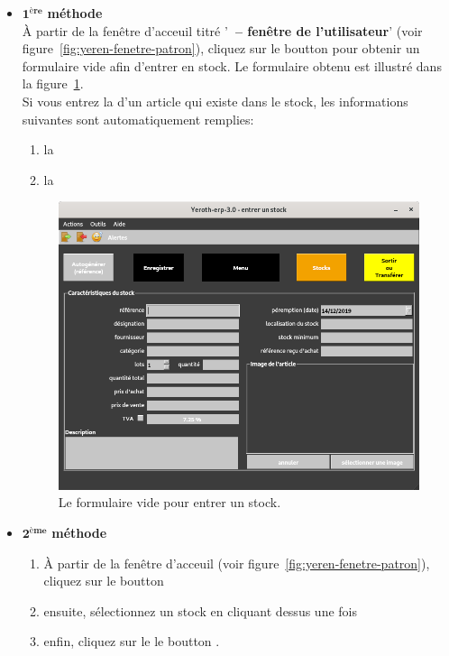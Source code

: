 \begin{itemize}[]
	\item \textcolor{purplish}{$\mathbf{1^{\text{\`ere}}}$ \textbf{m\'ethode}}\\
		   \`A partir de la fen\^etre d'acceuil titr\'e
		   '\textbf{\yerotherptitle\ -- fen\^etre de l'utilisateur}'
		   (voir figure~\ref{fig:yeren-fenetre-patron}), cliquez
		   sur le boutton  pour obtenir un
		   formulaire vide afin d'entrer en stock. Le formulaire
		   obtenu est illustr\'e dans la figure~\ref{fig:formulaire-entrer-1}.\\
		   
		   Si vous entrez la  d'un article qui existe
		   \deja dans le stock, les informations suivantes sont
		   automatiquement remplies:
		   \begin{enumerate}
		   		\item la \yerenfield{\designation}
		   		\item la \yerenfield{\designation}		   		
		   \end{enumerate}		    
		   
	      \begin{figure}[!htbp]
		  \centering
		  \includegraphics[scale=0.63]{images/yeren-fenetre-entrer.png}
		  \caption{Le formulaire vide pour entrer un stock.}
		  \label{fig:formulaire-entrer-1}
		  \end{figure}
	      
	      \newpage
	      
	\item \textcolor{purplish}{$\mathbf{2^{\text{\`eme}}}$ \textbf{m\'ethode}}
		\begin{enumerate}[1)]
			\item \`A partir de la fen\^etre d'acceuil
			(voir figure~\ref{fig:yeren-fenetre-patron}),
			cliquez sur le boutton 
			\item ensuite, s\'electionnez un stock en cliquant dessus une fois
			\item enfin, cliquez sur le le boutton .\\
		\end{enumerate}				
		

\end{itemize}
